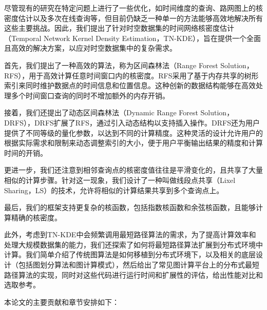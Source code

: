 尽管现有的研究在特定问题上进行了一些优化，如时间维度的查询、路网图上的核密度估计以及多次在线查询等，但目前仍缺乏一种单一的方法能够高效地解决所有这些主要挑战。因此，我们提出了针对时空数据集的时间网络核密度估计（Temporal Network Kernel Density Estimation，TN-KDE），旨在提供一个全面且高效的解决方案，以应对时空数据集中的复杂需求。

首先，我们提出了一种高效的算法，称为区间森林法（Range Forest Solution，RFS），用于高效计算任意时间窗口内的核密度。RFS采用了基于内存共享的树形索引来同时维护数据点的时间信息和位置信息。这种创新的数据结构能够在高效处理多个时间窗口查询的同时不增加额外的内存开销。

接着，我们还提出了动态区间森林法（Dynamic Range Forest Solution，DRFS），DRFS扩展了RFS，通过引入动态结构以支持插入操作。DRFS还为用户提供了不同等级的量化参数，以达到不同的计算精度。这种灵活的设计允许用户的根据实际需求和限制来动态调整索引的大小，便于用户平衡输出结果的精度和计算时间的开销。

更进一步，我们还注意到相邻查询点的核密度值往往是平滑变化的，且共享了大量相似的计算步骤。针对这一现象，我们设计了一种叫做线段点共享（Lixel Sharing，LS）的技术，允许将相似的计算结果共享到多个查询点上。

最后，我们的框架支持更复杂的核函数，包括指数核函数和余弦核函数，且能够计算精确的核密度。

此外，考虑到TN-KDE中会频繁调用最短路径算法的需求，为了提高计算效率和处理大规模数据集的能力，我们还探索了如何将最短路径算法扩展到分布式环境中计算。我们简单介绍了传统图算法是如何移植到分布式环境下，以及相关的底层设计（包括图划分算法和图计算模式），然后给出了常见图计算平台上的分布式最短路径算法的实现，同时对这些代码进行运行时间和扩展性的评估，给出性能对比和选取参考。

本论文的主要贡献和章节安排如下：

